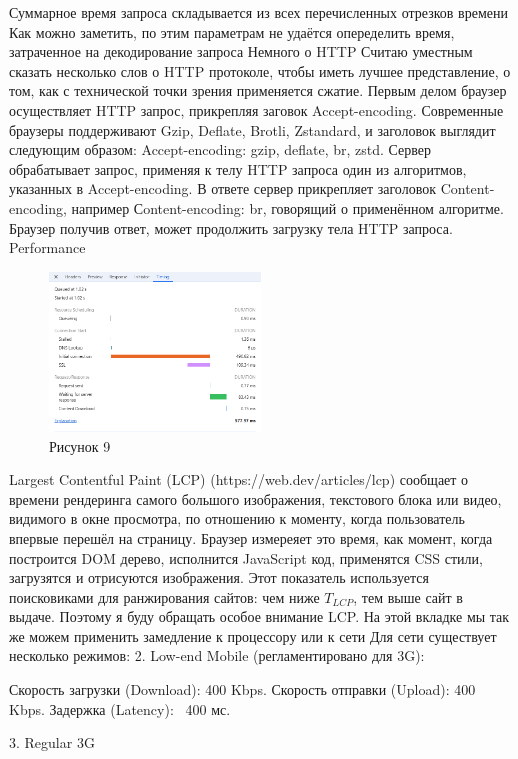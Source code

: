 \documentclass[12pt]{article}
\begin{document}
Суммарное время запроса складывается из всех перечисленных отрезков времени
Как можно заметить, по этим параметрам не удаётся опеределить время, затраченное на декодирование запроса
Немного о HTTP
Считаю уместным сказать несколько слов о HTTP протоколе, чтобы иметь лучшее представление, о том, как с технической точки зрения применяется сжатие.
Первым делом браузер осуществляет HTTP запрос, прикрепляя заговок Accept-encoding. Современные браузеры поддерживают Gzip, Deflate, Brotli, Zstandard, и заголовок выглядит следующим 
образом: Accept-encoding: gzip, deflate, br, zstd. Сервер обрабатывает запрос, применяя к телу HTTP запроса один из алгоритмов, указанных в Accept-encoding. В ответе сервер прикрепляет заголовок Content-encoding, например Сontent-encoding: br, говорящий о применённом алгоритме. Браузер получив ответ, может продолжить загрузку тела HTTP запроса. 
Performance
\begin{figure}[h!]
\centering
\includegraphics[width=0.5\textwidth]{../images/network__timing.png}
\caption{Рисунок 9}
\end{figure}

Largest Contentful Paint (LCP) (https://web.dev/articles/lcp) сообщает о времени рендеринга самого большого изображения, текстового блока или видео,
видимого в окне просмотра, по отношению к моменту, когда пользователь впервые перешёл на страницу. Браузер измереяет это время, как момент, когда построится DOM дерево, исполнится JavaScript код, применятся CSS стили, загрузятся и отрисуются изображения. Этот показатель используется поисковиками для ранжирования сайтов: чем ниже $T_{LCP}$, тем выше сайт в выдаче.
Поэтому я буду обращать особое внимание LCP.
На этой вкладке мы так же можем применить замедление к процессору или к сети
Для сети существует несколько режимов:
2. Low-end Mobile (регламентировано для 3G):

Скорость загрузки (Download): 400 Kbps.
Скорость отправки (Upload): 400 Kbps.
Задержка (Latency): ~400 мс.

3. Regular 3G
\end{document}
